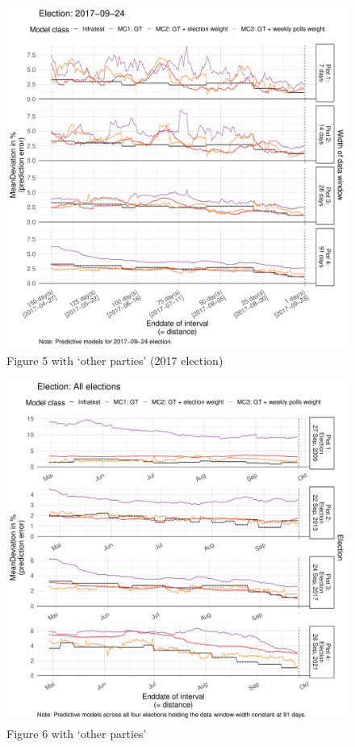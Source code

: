 \documentclass[
  letterpaper,
  DIV=11,
  numbers=noendperiod]{scrartcl}
\begin{document}
\begin{figure}[H]

\caption{\label{fig-A16}Figure 5 with `other parties' (2017 election)}

{\centering \includegraphics{figures/fig-A16-1.pdf}

}

\end{figure}

\begin{figure}[H]

\caption{\label{fig-A17}Figure 6 with `other parties'}

{\centering \includegraphics{figures/fig-A17-1.pdf}

}

\end{figure}
\end{document}
